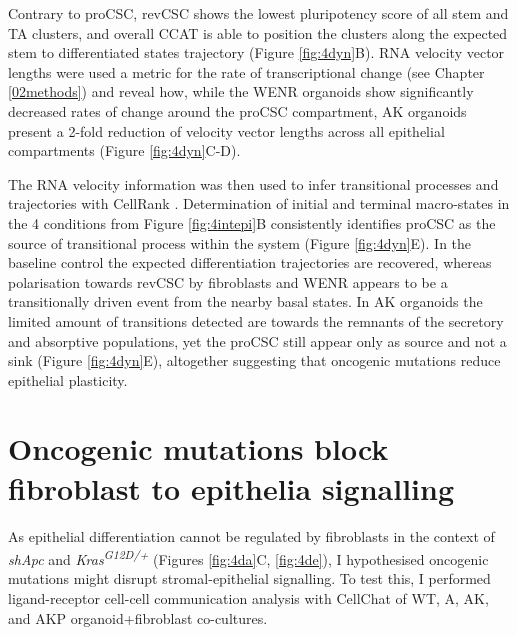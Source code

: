 Contrary to proCSC, revCSC shows the lowest pluripotency score of all stem and TA clusters, and overall CCAT is able to position the clusters along the expected stem to differentiated states trajectory (Figure \ref{fig:4dyn}B). RNA velocity\cite{bergen_generalizing_2020} vector lengths were used a metric for the rate of transcriptional change (see Chapter \ref{02methods}) and reveal how, while the WENR organoids show significantly decreased rates of change around the proCSC compartment, AK organoids present a 2-fold reduction of velocity vector lengths across all epithelial compartments (Figure \ref{fig:4dyn}C-D).

The RNA velocity information was then used to infer transitional processes and trajectories with CellRank \cite{lange_cellrank_2022}. Determination of initial and terminal macro-states in the 4 conditions from Figure \ref{fig:4intepi}B consistently identifies proCSC as the source of transitional process within the system (Figure \ref{fig:4dyn}E). In the baseline control the expected differentiation trajectories are recovered, whereas polarisation towards revCSC by fibroblasts and WENR appears to be a transitionally driven event from the nearby basal states. In AK organoids the limited amount of transitions detected are towards the remnants of the secretory and absorptive populations, yet the proCSC still appear only as source and not a sink (Figure \ref{fig:4dyn}E), altogether suggesting that oncogenic mutations reduce epithelial plasticity. 

\section{Oncogenic mutations block fibroblast to epithelia signalling}

As epithelial differentiation cannot be regulated by fibroblasts in the context of \textit{shApc} and \textit{Kras\textsuperscript{G12D/+}} (Figures \ref{fig:4da}C, \ref{fig:4de}), I hypothesised oncogenic mutations might disrupt stromal-epithelial signalling. To test this, I performed ligand-receptor cell-cell communication analysis with CellChat \cite{jin_inference_2021} of WT, A, AK, and AKP organoid+fibroblast co-cultures. 

